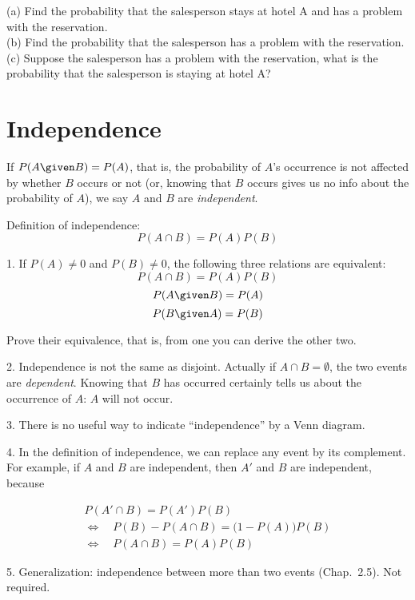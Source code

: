 \documentclass[12pt]{article}
\begin{document}
(a) Find the probability that the salesperson stays at hotel A and has a
problem with the reservation.\\
(b) Find the probability that the salesperson has a problem with the
reservation.\\
(c) Suppose the salesperson has a problem with the reservation, what is
the probability that the salesperson is staying at hotel A?



\section{Independence}

If $P(A \given B) = P(A)$,
that is, the probability of $A$'s occurrence is not affected by whether
$B$ occurs or not (or, knowing that $B$ occurs gives us no info
about the probability of $A$), we say $A$ and $B$ are \emph{independent}.

Definition of independence:
\[ P(A \cap B) = P(A) P(B) \]

\alert
1. If $P(A) \ne 0$ and $P(B) \ne 0$,
the following three relations are equivalent:
\[ P(A \cap B) = P(A) P(B) \]
\[ P(A \given B) = P(A) \]
\[ P(B \given A) = P(B) \]

\exercise
Prove their equivalence, that is,
from one you can derive the other two.

2. Independence is not the same as disjoint.
Actually if $A \cap B = \emptyset$, the two events are
\emph{dependent}.
Knowing that $B$ has occurred certainly tells us about the
occurrence of $A$: $A$ will not occur.

3. There is no useful way to indicate ``independence'' by a Venn
diagram.

4. In the definition of independence, we can replace any event by its
complement. For example, if $A$ and $B$ are independent, then $A'$ and
$B$ are independent, because

\begin{gather*}
P(A' \cap B) = P(A') P(B) \\
\Leftrightarrow\quad
P(B) - P(A \cap B) = \bigl(1 - P(A)\bigr) P(B) \\
\Leftrightarrow\quad
P(A \cap B) = P(A) P(B)
\end{gather*}

5. Generalization: independence between more than two events
(Chap.~2.5).
Not required.
\end{document}
